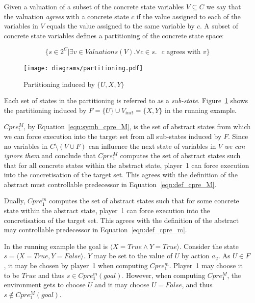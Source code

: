 Given a valuation of a subset of the concrete state variables $V \subseteq C$ we say that the valuation \emph{agrees} with a concrete state $c$ if the value assigned to each of the variables in $V$ equals the value assigned to the same variable by $c$. A subset of concrete state variables defines a partitioning of the concrete state space: 

\begin{equation}
    \{ s \in 2^C | \exists v \in Valuations(V). \forall c \in s. \text{ $c$ agrees with $v$} \}
\end{equation}

\begin{figure}
\centering
\texttt{[image: diagrams/partitioning.pdf]}
\caption{Partitioning induced by $\{U, X, Y\}$}
\label{fig:f_partitioning}
\end{figure}

Each set of states in the partitioning is referred to as a \emph{sub-state}. Figure~\ref{fig:f_partitioning} shows the partitioning induced by $F=\{U\} \cup V_{init}=\{X, Y\}$ in the running example.

$Cpre_1^M$, by Equation~\ref{eqn:symb_cpre_M}, is the set of abstract states from which we can force execution into the target set from all sub-states induced by $F$. Since no variables in $C \setminus (V \cup F)$ can influence the next state of variables in $V$ \emph{we can ignore them} and conclude that $Cpre_1^M$ computes the set of abstract states such that for all concrete states within the abstract state, player~1 can force execution into the concretisation of the target set. This agrees with the definition of the abstract must controllable predecessor in Equation~\ref{eqn:def_cpre_M}.

Dually, $Cpre_1^m$ computes the set of abstract states such that for some concrete state within the abstract state, player~1 can force execution into the concretisation of the target set. This agrees with the definition of the abstract may controllable predecessor in Equation~\ref{eqn:def_cpre_m}.

In the running example the goal is $\langle X=True \land Y=True \rangle$. Consider the state $s = \langle X=True, Y=False \rangle$. $Y$ may be set to the value of $U$ by action $a_2$. As $U \in F$, it may be chosen by player~1 when computing $Cpre_1^m$. Player~1 may choose it to be $True$ and thus $s \in Cpre_1^m(goal)$. However, when computing $Cpre_1^M$, the environment gets to choose $U$ and it may choose $U=False$, and thus $s \notin Cpre_1^M(goal)$.


